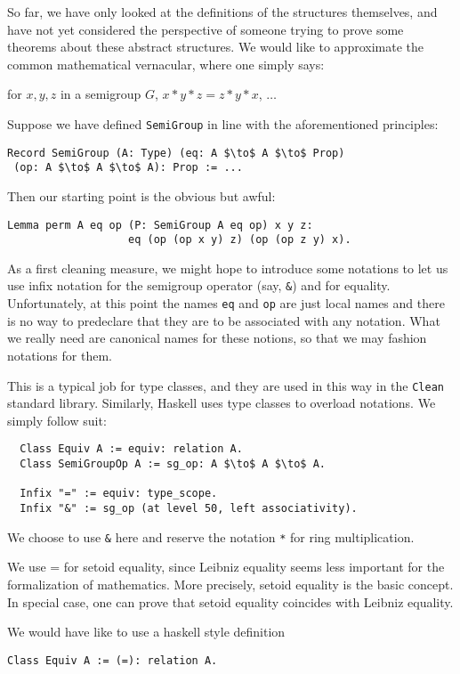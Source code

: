\documentclass[a4paper,10pt,runningheads]{llncs}
\begin{document}
So far, we have only looked at the definitions of the structures themselves, and have not yet
considered the perspective of someone trying to prove some theorems about these abstract structures.
We would like to approximate the common mathematical vernacular, where one
simply says:

for $x, y, z$ in a semigroup $G$, $x * y * z = z * y * x$, $\ldots$

Suppose we have defined \lstinline|SemiGroup| in line with the aforementioned principles:
\begin{lstlisting}
Record SemiGroup (A: Type) (eq: A $\to$ A $\to$ Prop)
 (op: A $\to$ A $\to$ A): Prop := ...
\end{lstlisting}

Then our starting point is the obvious but awful:
\begin{lstlisting}
Lemma perm A eq op (P: SemiGroup A eq op) x y z:
                   eq (op (op x y) z) (op (op z y) x).
\end{lstlisting}

As a first cleaning measure, we might hope to introduce some notations to let us use infix notation
for the semigroup operator (say, \lstinline|&|) and for equality. Unfortunately, at this point the names \lstinline|eq| and \lstinline|op| are just local names and there is no way to predeclare that they are to be associated with any notation. What we really need are canonical names for these notions, so that we may fashion notations for them.

This is a typical job for type classes, and they are used in this way in the \lstinline|Clean| standard
library. Similarly, Haskell uses type classes to overload notations.
We simply follow suit:
\begin{lstlisting}
  Class Equiv A := equiv: relation A.
  Class SemiGroupOp A := sg_op: A $\to$ A $\to$ A.

  Infix "=" := equiv: type_scope.
  Infix "&" := sg_op (at level 50, left associativity).
\end{lstlisting}

We choose to use \lstinline|&| here and reserve the notation \lstinline|*| for ring multiplication.

We use = for setoid equality, since Leibniz equality seems less important for the formalization of
mathematics. More precisely, setoid equality is the basic concept. In special case, one can prove
that setoid equality coincides with Leibniz equality.

We would have like to use a haskell style definition
\begin{lstlisting}
Class Equiv A := (=): relation A.
\end{lstlisting}
\end{document}
